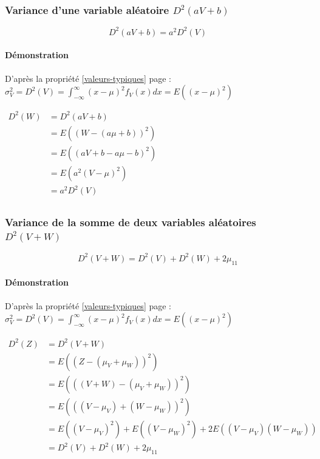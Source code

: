 \newpage
\subsubsection{Variance d'une variable aléatoire $D^2(aV+b)$}
\label{distribution-variance}
$$\boxed{D^2(aV+b) = a^2D^2(V)}$$
\paragraph{Démonstration}
D'après la propriété \ref{valeurs-typiques} page \pageref{valeurs-typiques} : $\displaystyle\sigma_V^2 = D^2(V) = \int_{-\infty}^\infty (x-\mu)^2 f_V(x)dx = E\left((x-\mu)^2\right)$
\begin{center}
$\begin{array}{LL}
D^2(W) &= D^2(aV+b)\\
       &= E\left((W-(a\mu+b))^2\right)\\
       &= E\left((aV+b-a\mu-b)^2\right)\\
       &= E\left(a^2(V-\mu)^2\right)\\
       &= a^2D^2(V)\\
\end{array}$
\end{center}






\subsubsection{Variance de la somme de deux variables aléatoires $D^2(V+W)$}
\label{distribution-somme-variance}
$$\boxed{D^2(V+W) = D^2(V)+D^2(W)+2\mu_{11}}$$
\paragraph{Démonstration}
D'après la propriété \ref{valeurs-typiques} page \pageref{valeurs-typiques} : $\displaystyle\sigma_V^2 = D^2(V) = \int_{-\infty}^\infty (x-\mu)^2 f_V(x)dx = E\left((x-\mu)^2\right)$
\begin{center}
$\begin{array}{LL}
D^2(Z) &= D^2(V+W)\\
       &= E\left((Z-(\mu_V+\mu_W))^2\right)\\
       &= E\left(((V+W)-(\mu_V+\mu_W))^2\right)\\
       &= E\left(((V-\mu_V)+(W-\mu_W))^2\right)\\
       &= E\left((V-\mu_V)^2\right) + E\left((V-\mu_W)^2\right) + 2E\left((V-\mu_V)(W-\mu_W)\right)\\
       &= D^2(V)+D^2(W)+2\mu_{11}\\
\end{array}$
\end{center}

